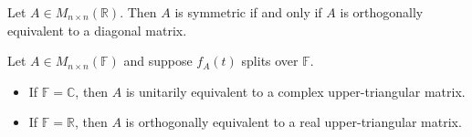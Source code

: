 \documentclass[12pt]{article}
\newenvironment{theorem}[2][Theorem]{\begin{trivlist}
\item[\hskip \labelsep {\bfseries #1}\hskip \labelsep {\bfseries #2.}]}{\end{trivlist}}
\begin{document}
\begin{theorem}{6.20}
Let $A \in M_{n \times n}(\mathbb{R})$. Then $A$ is symmetric if and only if $A$ is orthogonally equivalent to a diagonal matrix.
\end{theorem}

\begin{theorem}{6.21 (Schur)}
Let $A \in M_{n \times n}(\mathbb{F})$ and suppose $f_A(t)$ splits over $\mathbb{F}$.

\begin{itemize}
    \item[(a)] If $\mathbb{F} = \mathbb{C}$, then $A$ is unitarily equivalent to a complex upper-triangular matrix.
    
    \item[(b)] If $\mathbb{F} = \mathbb{R}$, then $A$ is orthogonally equivalent to a real upper-triangular matrix.
\end{itemize}
\end{theorem}
\end{document}
